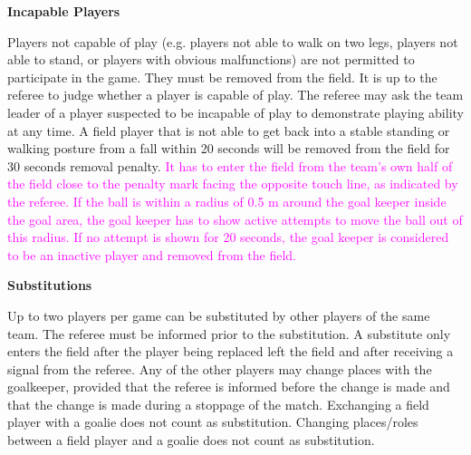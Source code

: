 \bigskip


\bigskip

{\bfseries Incapable Players}

Players not capable of play (e.g. players not able to walk on two legs, players not able to stand, or players with obvious malfunctions) are not permitted to participate in the game. They must be removed from the field. It is up to the referee to judge whether a player is capable of play. The referee may ask the team leader of a player suspected to be incapable of play to demonstrate playing ability at any time. A field player that is not able to get back into a stable standing or walking posture from a fall within 20 seconds will be removed from the field for 30 seconds removal penalty. \textcolor{magenta}{It has to enter the field from the team's own half of the field close to the penalty mark facing the opposite touch line, as indicated by the referee. If the ball is within a radius of 0.5 m around the goal keeper inside the goal area, the goal keeper has to show active attempts to move the ball out of this radius. If no attempt is shown for 20 seconds, the goal keeper is considered to be an inactive player and removed from the field.}

\bigskip

{\bfseries Substitutions}

Up to two players per game can be substituted by other players of the same team. The referee must be informed prior to the substitution. A substitute only enters the field after the player being replaced left the field and after receiving a signal from the referee. Any of the
other players may change places with the goalkeeper, provided that the referee is informed before the change is made and that the change is made during a stoppage of the match. Exchanging a field player with a goalie does not count as substitution. Changing places/roles between a
field player and a goalie does not count as substitution.

